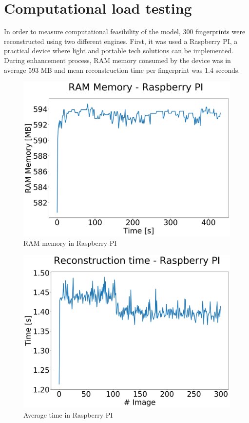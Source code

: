 \documentclass[a4paper,fleqn]{cas-dc}
\begin{document}
\section{Computational load testing}
\label{sec:CLT}

In order to measure computational feasibility of the model, 300 fingerprints were reconstructed using two different engines. First, it was used a Raspberry PI, a practical device where light and portable tech solutions can be implemented. During enhancement process, RAM memory consumed by the device was in average 593 MB and mean reconstruction time per fingerprint was 1.4 seconds.

\begin{figure}[htbp]
\centerline{\includegraphics[scale=0.22]{figs/RAM RB.png}}
\caption{RAM memory in Raspberry PI}
\label{fig11}
\end{figure}

\begin{figure}[htbp]
\centerline{\includegraphics[scale=0.22]{figs/Time RB.png}}
\caption{Average time in Raspberry PI}
\label{fig11}
\end{figure}
\end{document}
